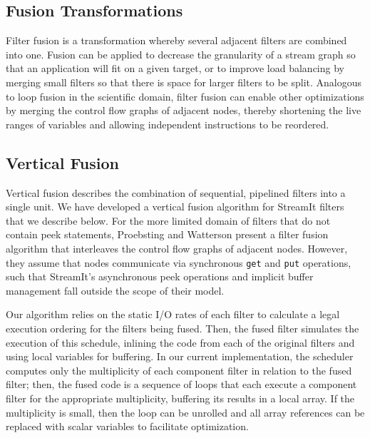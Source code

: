 
\subsection{Fusion Transformations}

Filter fusion is a transformation whereby several adjacent filters are
combined into one.  Fusion can be applied to decrease the granularity
of a stream graph so that an application will fit on a given target,
or to improve load balancing by merging small filters so that there is
space for larger filters to be split.  Analogous to loop fusion in the
scientific domain, filter fusion can enable other optimizations by
merging the control flow graphs of adjacent nodes, thereby shortening
the live ranges of variables and allowing independent instructions to
be reordered.

\subsection{Vertical Fusion}

Vertical fusion describes the combination of sequential, pipelined
filters into a single unit.  We have developed a vertical fusion
algorithm for StreamIt filters that we describe below.  For the more
limited domain of filters that do not contain peek statements,
Proebsting and Watterson \cite{pro96} present a filter fusion
algorithm that interleaves the control flow graphs of adjacent nodes.
However, they assume that nodes communicate via synchronous {\tt get}
and {\tt put} operations, such that StreamIt's asynchronous peek
operations and implicit buffer management fall outside the scope of
their model.

Our algorithm relies on the static I/O rates of each filter to
calculate a legal execution ordering for the filters being fused.
Then, the fused filter simulates the execution of this schedule,
inlining the code from each of the original filters and using local
variables for buffering.  In our current implementation, the scheduler
computes only the multiplicity of each component filter in relation to
the fused filter; then, the fused code is a sequence of loops that
each execute a component filter for the appropriate multiplicity,
buffering its results in a local array.  If the multiplicity is small,
then the loop can be unrolled and all array references can be replaced
with scalar variables to facilitate optimization.

